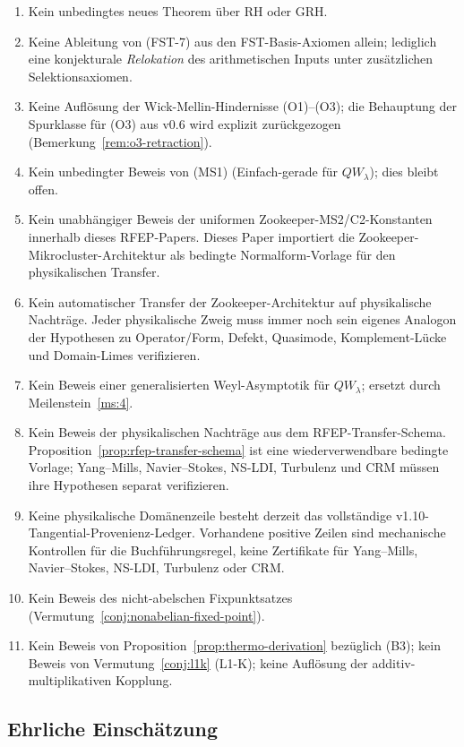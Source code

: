 \documentclass[11pt,a4paper]{article}
\theoremstyle{plain}
\theoremstyle{definition}
\begin{document}
\begin{enumerate}[leftmargin=*]
\item Kein unbedingtes neues Theorem über RH oder GRH.
\item Keine Ableitung von (FST-7) aus den FST-Basis-Axiomen allein;
  lediglich eine konjekturale \emph{Relokation} des arithmetischen Inputs
  unter zusätzlichen Selektionsaxiomen.
\item Keine Auflösung der Wick-Mellin-Hindernisse (O1)--(O3); die Behauptung der
  Spurklasse für (O3) aus v0.6 wird explizit zurückgezogen (Bemerkung~\ref{rem:o3-retraction}).
\item Kein unbedingter Beweis von (MS1) (Einfach-gerade für $QW_\lambda$);
  dies bleibt offen.
\item Kein unabhängiger Beweis der uniformen Zookeeper-MS2/C2-Konstanten
  innerhalb dieses RFEP-Papers. Dieses Paper importiert die Zookeeper-
  Mikrocluster-Architektur als bedingte Normalform-Vorlage für den
  physikalischen Transfer.
\item Kein automatischer Transfer der Zookeeper-Architektur auf physikalische
  Nachträge. Jeder physikalische Zweig muss immer noch sein eigenes Analogon
  der Hypothesen zu Operator/Form, Defekt, Quasimode, Komplement-Lücke und Domain-Limes verifizieren.
\item Kein Beweis einer generalisierten Weyl-Asymptotik für $QW_\lambda$;
  ersetzt durch Meilenstein~\ref{ms:4}.
\item Kein Beweis der physikalischen Nachträge aus dem RFEP-Transfer-Schema.
  Proposition~\ref{prop:rfep-transfer-schema} ist eine wiederverwendbare
  bedingte Vorlage; Yang--Mills, Navier--Stokes, NS-LDI, Turbulenz und CRM müssen
  ihre Hypothesen separat verifizieren.
\item Keine physikalische Domänenzeile besteht derzeit das vollständige
  v1.10-Tangential-Provenienz-Ledger. Vorhandene positive Zeilen sind
  mechanische Kontrollen für die Buchführungsregel, keine Zertifikate
  für Yang--Mills, Navier--Stokes, NS-LDI, Turbulenz oder CRM.
\item Kein Beweis des nicht-abelschen Fixpunktsatzes
  (Vermutung~\ref{conj:nonabelian-fixed-point}).
\item Kein Beweis von Proposition~\ref{prop:thermo-derivation} bezüglich (B3);
  kein Beweis von Vermutung~\ref{conj:l1k} (L1-K); keine Auflösung der
  additiv-multiplikativen Kopplung.
\end{enumerate}

\subsection{Ehrliche Einschätzung}
\end{document}
